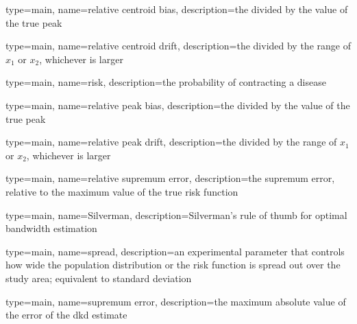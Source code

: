 {%
   type=main,
   name={relative centroid bias},
   description={the  divided by the value of the true peak}
}

{%
   type=main,
   name={relative centroid drift},
   description={the  divided by the range of \ensuremath{x_1} or \ensuremath{x_2}, whichever is larger}
}

{
   type=main,
   name={risk},
   description={the probability of contracting a disease}
}

{%
   type=main,
   name={relative peak bias},
   description={the  divided by the value of the true peak}
}

{%
   type=main,
   name={relative peak drift},
   description={the  divided by the range of \ensuremath{x_1} or \ensuremath{x_2}, whichever is larger}
}

{%
   type=main,
   name={relative supremum error},
   description={the supremum error, relative to the maximum value of the true risk function}
}

{
   type=main,
   name={Silverman},
   description={Silverman's rule of thumb for optimal bandwidth estimation}
}

{
   type=main,
   name={spread},
   description={an experimental parameter that controls how wide the population distribution or the risk function is spread out over the study area; equivalent to standard deviation}
}

{%
   type=main,
   name={supremum error},
   description={the maximum absolute value of the error of the dkd estimate}
}


